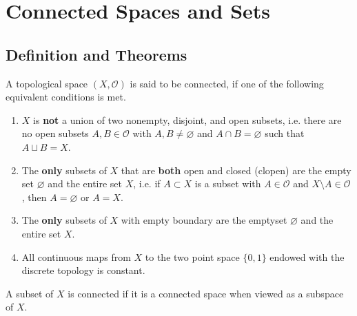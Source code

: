 \chapter{Connected Spaces and Sets}
\section{Definition and Theorems}
\begin{defbox}
    \begin{definition}
        A {\color{mathobj}topological space} \((X, \mathcal{O})\) is said to be {\color{maththen}connected}, if one of the following {\color{mathrem}equivalent} conditions is met.
        \begin{enumerate}
            \item \(X\) is \textbf{not} a {\color{mathif}union} of two {\color{mathif}nonempty}, {\color{mathif}disjoint}, and {\color{mathif} open subsets}, i.e. there are no open subsets \(A, B \in \mathcal{O}\) with \(A, B \neq \varnothing\) and \(A \cap B = \varnothing\) such that \(A \sqcup B = X\).
            \item The \textbf{only} {\color{mathif}subsets} of \(X\) that are \textbf{both} {\color{mathif}open} and {\color{mathif}closed} ({\color{mathrem}clopen}) are the empty set \(\varnothing\) and the entire set \(X\), i.e. if \(A \subset X\) is a subset with \(A \in \mathcal{O}\) and \(X \setminus A \in \mathcal{O}\), then \(A = \varnothing\) or \(A = X\).
            \item The \textbf{only} {\color{mathif}subsets} of \(X\) with empty {\color{mathif}boundary} are the emptyset \(\varnothing\) and the entire set \(X\).
            \item All {\color{mathif}continuous} maps from \(X\) to the two point space \(\{0, 1\}\) endowed with the {\color{mathif}discrete} topology is {\color{mathif}constant}. 
        \end{enumerate}
        A {\color{mathobj}subset} of \(X\) is {\color{maththen}connected} if it is a {\color{mathif}connected space} when viewed as a {\color{mathif}subspace} of \(X\).
    \end{definition}
\end{defbox}


